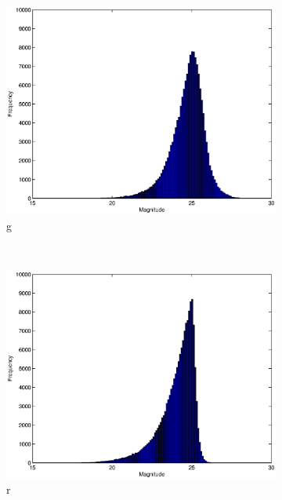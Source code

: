 \documentclass[useAMS,usenatbib,fleqn]{mn2e}
\begin{document}
\begin{figure}
        \centering
        \begin{subfigure}[b]{0.15\textwidth}
                \includegraphics[width=\columnwidth]{figures/g.eps}
                \caption{g}
        \end{subfigure}
        ~
        \begin{subfigure}[b]{0.15\textwidth}
                \includegraphics[width=\columnwidth]{figures/r.eps}
                \caption{r}
        \end{subfigure}
         ~
        \begin{subfigure}[b]{0.15\textwidth}

\end{subfigure}
\end{figure}
\end{document}
